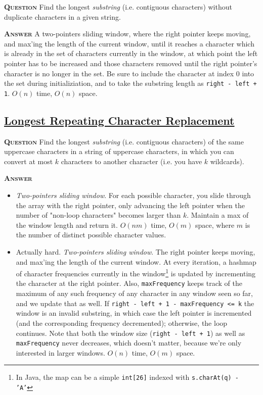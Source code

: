 \documentclass[table, xcdraw]{article}%
\begin{document}
\textsc{\textbf{Question}} Find the longest \emph{substring} (i.e. contiguous characters) without duplicate characters in a given string.

\textsc{\textbf{Answer}} A two-pointers sliding window, where the right pointer keeps moving, and max'ing the length of the current window, until it reaches a character which is already in the set of characters currently in the window, at which point the left pointer has to be increased and those characters removed until the right pointer's character is no longer in the set. Be sure to include the character at index 0 into the set during initializiation, and to take the substring length as \texttt{right - left + 1}. $O(n)$ time, $O(n)$ space.

\subsection{\href{https://leetcode.com/problems/longest-repeating-character-replacement}{Longest Repeating Character Replacement}}

\textsc{\textbf{Question}} Find the longest \emph{substring} (i.e. contiguous characters) of the same uppercase characters in a string of uppercase characters, in which you can convert at most $k$ characters to another character (i.e. you have $k$ wildcards).

\textsc{\textbf{Answer}}

\begin{itemize}
    \item \textit{Two-pointers sliding window}. For each possible character, you slide through the array with the right pointer, only advancing the left pointer when the number of "non-loop characters" becomes larger than $k$. Maintain a max of the window length and return it. $O(nm)$ time, $O(m)$ space, where $m$ is the number of distinct possible character values.
    \item Actually hard. \textit{Two-pointers sliding window}. The right pointer keeps moving, and max'ing the length of the current window. At every iteration, a hashmap of character frequencies currently in the window\footnote{In Java, the map can be a simple \texttt{int[26]} indexed with \texttt{s.charAt(q) - 'A'}} is updated by incrementing the character at the right pointer. Also, \texttt{maxFrequency} keeps track of the maximum of any such frequency of any character in any window seen so far, and we update that as well. If \texttt{right - left + 1 - maxFrequency <= k} the window is an invalid substring, in which case the left pointer is incremented (and the corresponding frequency decremented); otherwise, the loop continues. Note that both the window size (\texttt{right - left + 1}) as well as \texttt{maxFrequency} never decreases, which doesn't matter, because we're only interested in larger windows. $O(n)$ time, $O(m)$ space.
\end{itemize}
\end{document}
